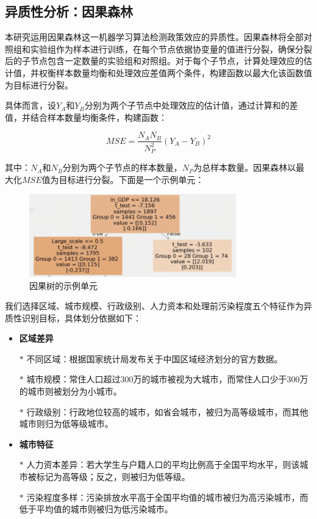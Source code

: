\documentclass[a4paper,12pt]{article}
\begin{document}
\subsection{异质性分析：因果森林}
本研究运用因果森林这一机器学习算法检测政策效应的异质性。因果森林将全部对照组和实验组作为样本进行训练，在每个节点依据协变量的值进行分裂，确保分裂后的子节点包含一定数量的实验组和对照组。对于每个子节点，计算处理效应的估计值，并权衡样本数量均衡和处理效应差值两个条件，构建函数以最大化该函数值为目标进行分裂。

具体而言，设$Y_A$和$Y_B$分别为两个子节点中处理效应的估计值，通过计算和的差值，并结合样本数量均衡条件，构建函数：

$$
MSE=\frac{N_AN_B}{N_P^2}\left(Y_A-Y_B\right)^2
$$

其中：$N_A$和$N_B$分别为两个子节点的样本数量，$N_P$为总样本数量。因果森林以最大化$MSE$值为目标进行分裂。下面是一个示例单元：

\begin{figure}[H]
    \centering
    \includegraphics[width=0.8\textwidth]{Tree5.png}  
    \caption{因果树的示例单元}
    \label{fig:Tree}  
\end{figure}

我们选择区域、城市规模、行政级别、人力资本和处理前污染程度五个特征作为异质性识别目标，具体划分依据如下：

\begin{itemize}
    \item \textbf{区域差异}
    \item[$\ast$] 不同区域：根据国家统计局发布关于中国区域经济划分的官方数据。
    \item[$\ast$] 城市规模：常住人口超过300万的城市被视为大城市，而常住人口少于300万的城市则被划分为小城市。
    \item[$\ast$] 行政级别：行政地位较高的城市，如省会城市，被归为高等级城市，而其他城市则归为低等级城市。
    \item \textbf{城市特征}
    \item[$\ast$]人力资本差异：若大学生与户籍人口的平均比例高于全国平均水平，则该城市被标记为高等级；反之，则被归为低等级。
    \item[$\ast$]污染程度多样：污染排放水平高于全国平均值的城市被归为高污染城市，而低于平均值的城市则被归为低污染城市。
\end{itemize}
\end{document}
